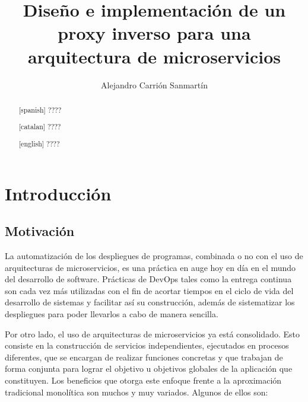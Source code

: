 \documentclass[11pt,spanish,listoffigures]{tfgetsinf}
\title{Diseño e implementación de un proxy inverso para una arquitectura de microservicios}
\author{Alejandro Carrión Sanmartín}
\begin{document}

\begin{abstract}[spanish]
????
\end{abstract}
\begin{abstract}[catalan]
????
\end{abstract}
\begin{abstract}[english]
????
\end{abstract}

\mainmatter


\chapter{Introducción}


	\section{Motivación}

La automatización de los despliegues de programas, combinada o no con el uso de arquitecturas de microservicios, es una práctica en auge hoy en día en el mundo del desarrollo de software. Prácticas de DevOps \cite{DevOps} tales como la entrega continua \cite{DevOpsPracticas} son cada vez más utilizadas con el fin de acortar tiempos en el ciclo de vida del desarrollo de sistemas y facilitar así su construcción, además de sistematizar los despliegues para poder llevarlos a cabo de manera sencilla.

Por otro lado, el uso de arquitecturas de microservicios \cite{Microservicios} ya está consolidado. Esto consiste en la construcción de servicios independientes, ejecutados en procesos diferentes, que se encargan de realizar funciones concretas y que trabajan de forma conjunta para lograr el objetivo u objetivos globales de la aplicación que constituyen. Los beneficios que otorga este enfoque frente a la aproximación tradicional monolítica son muchos y muy variados. Algunos de ellos son:
\end{document}
